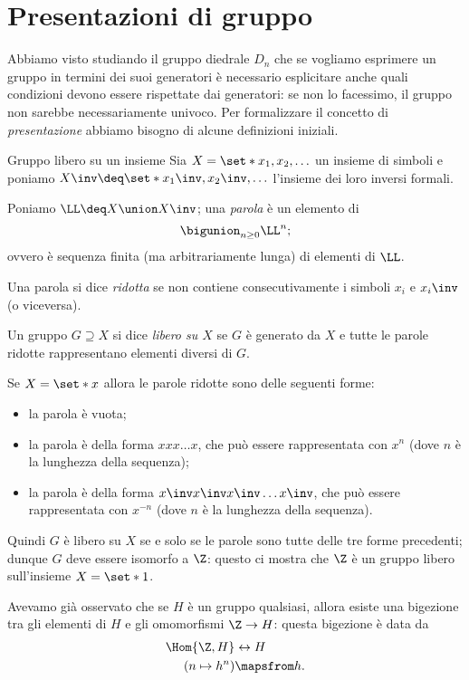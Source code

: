 \section{Presentazioni di gruppo}

Abbiamo visto studiando il gruppo diedrale $D_n$ che se vogliamo esprimere un gruppo in termini dei suoi generatori è necessario esplicitare anche quali condizioni devono essere rispettate dai generatori: se non lo facessimo, il gruppo non sarebbe necessariamente univoco. Per formalizzare il concetto di \emph{presentazione} abbiamo bisogno di alcune definizioni iniziali.

\begin{definition}
    {Gruppo libero su un insieme}{} Sia $X = \set*{x_1, x_2, \dots}$ un insieme di simboli e poniamo $X\inv \deq \set*{x_1\inv, x_2\inv, \dots}$ l'insieme dei loro inversi formali.

    Poniamo $\LL \deq X \union X\inv$; una \emph{parola} è un elemento di \[
        \bigunion_{n \geq 0} \LL^n;
    \] ovvero è sequenza finita (ma arbitrariamente lunga) di elementi di $\LL$.

    Una parola si dice \emph{ridotta} se non contiene consecutivamente i simboli $x_i$ e $x_i\inv$ (o viceversa).

    Un gruppo $G \supseteq X$ si dice \emph{libero su $X$} se $G$ è generato da $X$ e tutte le parole ridotte rappresentano elementi diversi di $G$.
\end{definition}

\begin{remark}
    Se $X = \set*{x}$ allora le parole ridotte sono delle seguenti forme:
    \begin{itemize}
        \item la parola è vuota;
        \item la parola è della forma $xxx\dots x$, che può essere rappresentata con $x^n$ (dove $n$ è la lunghezza della sequenza);
        \item la parola è della forma $x\inv x\inv x\inv \dots x\inv$, che può essere rappresentata con $x^{-n}$ (dove $n$ è la lunghezza della sequenza). 
    \end{itemize}

    Quindi $G$ è libero su $X$ se e solo se le parole sono tutte delle tre forme precedenti; dunque $G$ deve essere isomorfo a $\Z$: questo ci mostra che $\Z$ è un gruppo libero sull'insieme $X = \set*{1}$.
\end{remark}

Avevamo già osservato che se $H$ è un gruppo qualsiasi, allora esiste una bigezione tra gli elementi di $H$ e gli omomorfismi $\Z \to H$: questa bigezione è data da \begin{align*}
    \Hom{\Z, H} &\leftrightarrow H\\
    (n \mapsto h^n) &\mapsfrom h.
\end{align*}

